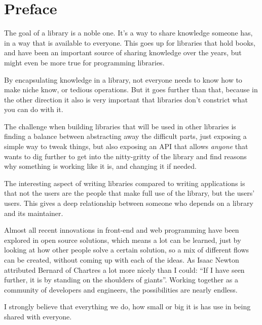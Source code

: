 
\chapter{Preface}%
\label{chp:preface}

The goal of a library is a noble one. It's a way to share knowledge someone has, in a way that is available to everyone. This goes up for libraries that hold books, and have been an important source of sharing knowledge over the years, but might even be more true for programming libraries. 

By encapsulating knowledge in a library, not everyone needs to know how to make niche know, or tedious operations. But it goes further than that, because in the other direction it also is very important that libraries don't constrict what you can do with it.

The challenge when building libraries that will be used in other libraries is finding a balance between abstracting away the difficult parts, just exposing a simple way to tweak things, but also exposing an API that allows \emph{anyone} that wants to dig further to get into the nitty-gritty of the library and find reasons why something is working like it is, and changing it if needed.

The interesting aspect of writing libraries compared to writing applications is that not the users are the people that make full use of the library, but the users' users. This gives a deep relationship between someone who depends on a library and its maintainer.

Almost all recent innovations in front-end and web programming have been explored in open source solutions, which means a lot can be learned, just by looking at how other people solve a certain solution, so a mix of different flows can be created, without coming up with each of the ideas. As Isaac Newton attributed\cite{newton-giants} Bernard of Chartres\cite{quote-giants-source} a lot more nicely than I could: ``If I have seen further, it is by standing on the shoulders of giants''. Working together as a community of developers and engineers, the possibilities are nearly endless.

I strongly believe that everything we do, how small or big it is has use in being shared with everyone.
